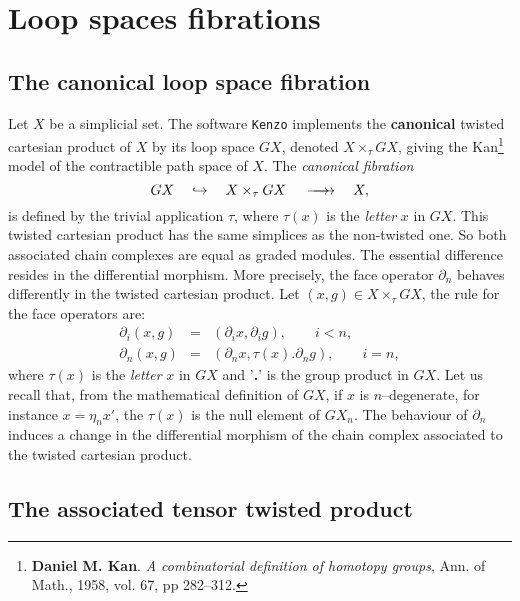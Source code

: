 \chapter {Loop spaces fibrations} 

\section{The canonical loop space fibration}

Let $X$ be a  simplicial set. The software {\tt Kenzo} implements the
{\bf canonical} twisted cartesian product of $X$ by its loop space $GX$, 
denoted $X \times_\tau GX$, giving the Kan\footnote {{\bf Daniel M. Kan}. {\em A combinatorial definition of
homotopy groups}, Ann. of Math., 1958, vol. 67, pp 282--312.} model of the contractible
path space of $X$.
The {\em canonical fibration}
$$ GX\quad \hookrightarrow\quad X \times_\tau GX  \hskip 1.2em \longrightarrow \hskip -1.2em \longrightarrow  
   \quad X,$$
is defined by the trivial application $\tau$, where $\tau(x)$ is the  {\em letter} $x$ in $GX$.
This twisted cartesian product has the same simplices as the non-twisted one.
So both associated chain complexes
are equal as graded modules. The essential difference  resides in the differential morphism.
More precisely, the face operator $\partial_n$ behaves differently in the twisted cartesian product. 
Let $(x,g) \in X \times_\tau GX$, the rule for the face operators are:
\begin{eqnarray*}
\partial_i(x,g) & =  & (\partial_i x, \partial_i g), \qquad i<n, \\
\partial_n(x,g) & =  & (\partial_n x, \tau(x).\partial_n g), \qquad i=n,
\end{eqnarray*}
where $\tau(x)$ is the {\em letter} $x$ in $GX$ and '{\bf .}' is the group product in $GX$. Let us recall
that, from the mathematical definition of $GX$, if $x$ is $n$--degenerate, for instance $x=\eta_n x'$,
the $\tau(x)$ is the null element of $GX_n$.
The behaviour of $\partial_n$ induces a change in the differential morphism of the chain complex
associated to the twisted cartesian product.

\section{The associated tensor twisted product}

